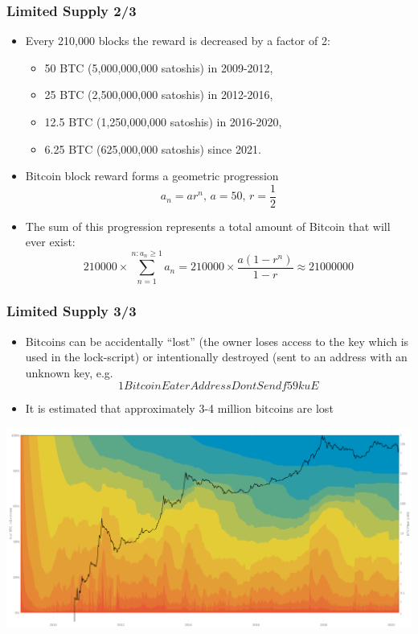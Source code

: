 \documentclass{beamer}
\begin{document}
\begin{frame}
  \frametitle{Limited Supply 2/3}
  \begin{itemize}
  \item Every 210,000 blocks the reward is decreased by a factor of 2:
    \begin{itemize}
    \item 50 BTC (5,000,000,000 satoshis) in 2009-2012,
    \item 25 BTC (2,500,000,000 satoshis) in 2012-2016,
    \item 12.5 BTC (1,250,000,000 satoshis) in 2016-2020,
    \item 6.25 BTC (625,000,000 satoshis) since 2021.
    \end{itemize}
  \item Bitcoin block reward forms a geometric progression
    $$a_n = ar^n \text{, } a = 50 \text{, } r = \frac{1}{2}$$
  \item The sum of this progression represents a total amount of Bitcoin that
    will ever exist:
    $$210000 \times \sum_{n = 1}^{n: a_n \geq 1} a_n = 210000 \times \frac{a(1 - r^n)}{1 - r} \approx 21000000$$
  \end{itemize}
\end{frame}

\begin{frame}
  \frametitle{Limited Supply 3/3}
  \begin{itemize}
    
  \item Bitcoins can be accidentally ``lost'' (the owner loses access to the key
    which is used in the lock-script) or intentionally destroyed (sent to an
    address with an unknown key, e.g.
    $$1BitcoinEaterAddressDontSendf59kuE$$
  \item It is estimated that approximately 3-4 million bitcoins are lost
  \end{itemize}
  \includegraphics[width=\textwidth]{utxo-age}
\end{frame}
\end{document}
